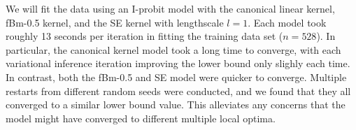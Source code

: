 \documentclass[a4paper,showframe,11pt]{report}\usepackage[]{graphicx}\usepackage[]{color}
\begin{document}
We will fit the data using an I-probit model with the canonical linear kernel, fBm-0.5 kernel, and the SE kernel with lengthscale $l=1$.
Each model took roughly 13 seconds per iteration in fitting the training data set ($n=528$).
In particular, the canonical kernel model took a long time to converge, with each variational inference iteration improving the lower bound only slighly each time.
In contrast, both the fBm-0.5 and SE model were quicker to converge.
Multiple restarts from different random seeds were conducted, and we found that they all converged to a similar lower bound value.
This alleviates any concerns that the model might have converged to different multiple local optima.
\end{document}
